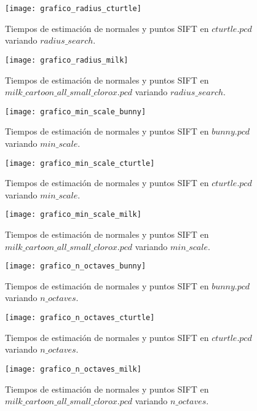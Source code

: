 \begin{figure}[h!]
\centering
\texttt{[image: grafico\_radius\_cturtle]}
\caption{Tiempos de estimación de normales y puntos SIFT en $cturtle.pcd$ variando $radius\_search$.}\label{fig:grafico_radius_cturtle}
\end{figure}


\begin{figure}[h!]
\centering
\texttt{[image: grafico\_radius\_milk]}
\caption{Tiempos de estimación de normales y puntos SIFT en $milk\_cartoon\_all\_small\_clorox.pcd$ variando $radius\_search$.}\label{fig:grafico_radius_milk}
\end{figure}


\begin{figure}[h!]
\centering
\texttt{[image: grafico\_min\_scale\_bunny]}
\caption{Tiempos de estimación de normales y puntos SIFT en $bunny.pcd$ variando $min\_scale$.}\label{fig:grafico_min_scale_bunny}
\end{figure}

\begin{figure}[h!]
\centering
\texttt{[image: grafico\_min\_scale\_cturtle]}
\caption{Tiempos de estimación de normales y puntos SIFT en $cturtle.pcd$ variando $min\_scale$.}\label{fig:grafico_min_scale_cturtle}
\end{figure}


\begin{figure}[h!]
\centering
\texttt{[image: grafico\_min\_scale\_milk]}
\caption{Tiempos de estimación de normales y puntos SIFT en $milk\_cartoon\_all\_small\_clorox.pcd$ variando $min\_scale$.}\label{fig:grafico_min_scale_milk}
\end{figure}


\begin{figure}[h!]
\centering
\texttt{[image: grafico\_n\_octaves\_bunny]}
\caption{Tiempos de estimación de normales y puntos SIFT en $bunny.pcd$ variando $n\_octaves$.}\label{fig:grafico_n_octaves_bunny}
\end{figure}

\begin{figure}[h!]
\centering
\texttt{[image: grafico\_n\_octaves\_cturtle]}
\caption{Tiempos de estimación de normales y puntos SIFT en $cturtle.pcd$ variando $n\_octaves$.}\label{fig:grafico_n_octaves_cturtle}
\end{figure}

\begin{figure}[h!]
\centering
\texttt{[image: grafico\_n\_octaves\_milk]}
\caption{Tiempos de estimación de normales y puntos SIFT en $milk\_cartoon\_all\_small\_clorox.pcd$ variando $n\_octaves$.}\label{fig:grafico_n_octaves_milk}
\end{figure}


